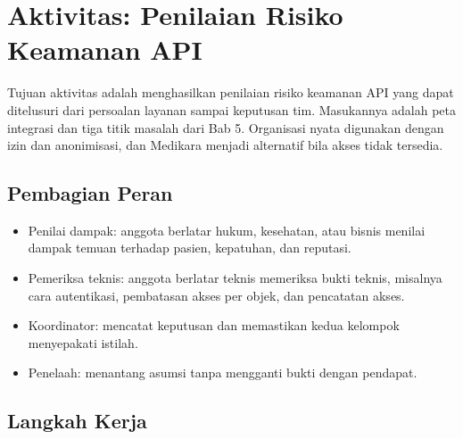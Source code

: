 \section{Aktivitas: Penilaian Risiko Keamanan API}

Tujuan aktivitas adalah menghasilkan penilaian risiko keamanan API yang dapat ditelusuri dari persoalan layanan sampai keputusan tim.
Masukannya adalah peta integrasi dan tiga titik masalah dari Bab 5. Organisasi nyata digunakan dengan izin dan anonimisasi, dan Medikara
menjadi alternatif bila akses tidak tersedia.

\subsection*{Pembagian Peran}

\begin{itemize}
  \item Penilai dampak: anggota berlatar hukum, kesehatan, atau bisnis menilai dampak temuan terhadap pasien, kepatuhan, dan reputasi.
  \item Pemeriksa teknis: anggota berlatar teknis memeriksa bukti teknis, misalnya cara autentikasi, pembatasan akses per objek, dan
        pencatatan akses.
  \item Koordinator: mencatat keputusan dan memastikan kedua kelompok menyepakati istilah.
  \item Penelaah: menantang asumsi tanpa mengganti bukti dengan pendapat.
\end{itemize}

\subsection*{Langkah Kerja}

